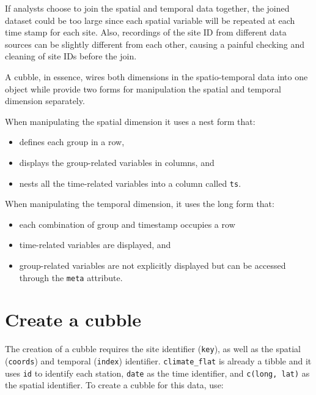 \documentclass[
]{jss}
\providecommand{\tightlist}{%
  \setlength{\itemsep}{0pt}\setlength{\parskip}{0pt}}
\begin{document}
If analysts choose to join the spatial and temporal data together, the
joined dataset could be too large since each spatial variable will be
repeated at each time stamp for each site. Also, recordings of the site
ID from different data sources can be slightly different from each
other, causing a painful checking and cleaning of site IDs before the
join.

A cubble, in essence, wires both dimensions in the spatio-temporal data
into one object while provide two forms for manipulation the spatial and
temporal dimension separately.

When manipulating the spatial dimension it uses a nest form that:

\begin{itemize}
\tightlist
\item
  defines each group in a row,
\item
  displays the group-related variables in columns, and
\item
  nests all the time-related variables into a column called \texttt{ts}.
\end{itemize}

When manipulating the temporal dimension, it uses the long form that:

\begin{itemize}
\tightlist
\item
  each combination of group and timestamp occupies a row
\item
  time-related variables are displayed, and
\item
  group-related variables are not explicitly displayed but can be
  accessed through the \texttt{meta} attribute.
\end{itemize}

\newpage

\hypertarget{create-a-cubble}{%
\section{Create a cubble}\label{create-a-cubble}}

The creation of a cubble requires the site identifier (\texttt{key}), as
well as the spatial (\texttt{coords}) and temporal (\texttt{index})
identifier. \texttt{climate\_flat} is already a tibble and it uses
\texttt{id} to identify each station, \texttt{date} as the time
identifier, and \texttt{c(long,\ lat)} as the spatial identifier. To
create a cubble for this data, use:
\end{document}
